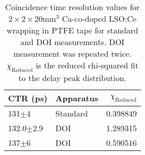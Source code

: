 \begin{table}
\caption{\label{tab:referencevals} Coincidence time resolution values for $2\times2\times20$mm$^3$ Ca-co-doped LSO:Ce wrapping in PTFE tape for standard and DOI measurements. DOI measurement was repeated twice. $\chi_\text{Reduced}$ is the reduced chi-squared fit to the delay peak distribution.}
\begin{tabular}{llr}
\hline
       CTR (ps) &   Apparatus &  $\chi_\text{Reduced}$ \\
\hline
     131$\pm$4 &  Standard &    0.398849 \\
 132.0$\pm$2.9 &   DOI &    1.289315 \\
     137$\pm$6 &   DOI &    0.590516 \\
\hline
\end{tabular}
\end{table}